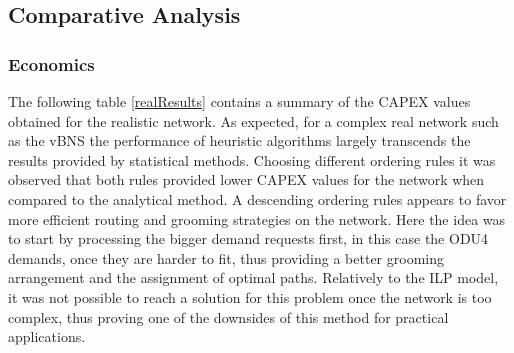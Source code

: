 

\subsection{Comparative Analysis}

\subsubsection{Economics}
\vspace{11pt}
The following table \ref{realResults} contains a summary of the CAPEX values obtained for the realistic network. As expected, for a complex real network such as the vBNS the performance of heuristic algorithms largely transcends the results provided by statistical methods. Choosing different ordering rules it was observed that both rules provided lower CAPEX values for the network when compared to the analytical method. A descending ordering rules appears to favor more efficient routing and grooming strategies on the network. Here the idea was to start by processing the bigger demand requests first, in this case the ODU4 demands, once they are harder to fit, thus providing a better grooming arrangement and the assignment of optimal paths. Relatively to the ILP model, it was not possible to reach a solution for this problem once the network is too complex, thus proving one of the downsides of this method for practical applications.

\vspace{11pt}

